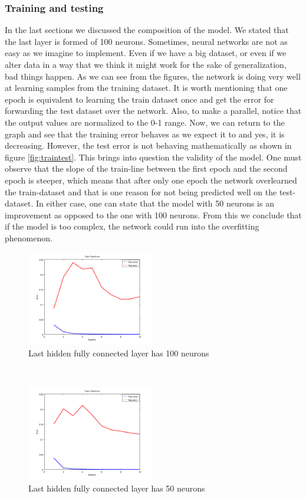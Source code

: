 \subsubsection{Training and testing}
In the last sections we discussed the composition of the model. We stated that the last layer is formed of 100 neurons. Sometimes, neural networks are not as easy as we imagine to implement. Even if we have a big dataset, or even if we alter data in a way that we think it might work for the sake of generalization, bad things happen. As we can see from the figures, the network is doing very well at learning samples from the training dataset. It is worth mentioning that one epoch is equivalent to learning the train dataset once and get the error for forwarding the test dataset over the network. Also, to make a parallel, notice that the output values are normalized to the 0-1 range. Now, we can return to the graph and see that the training error behaves as we expect it to and yes, it is decreasing. However, the test error is not behaving mathematically as shown in figure \ref{fig:traintest}. This brings into question the validity of the model. One must observe that the slope of the train-line between the first epoch and the second epoch is steeper, which means that after only one epoch the network overlearned the train-dataset and that is one reason for not being predicted well on the test-dataset. In either case, one can state that the model with 50 neurons is an improvement as opposed to the one with 100 neurons. From this we conclude that if the model is too complex, the network could run into the overfitting phenomenon.
\begin{figure}[h]
	\begin{center}
		\includegraphics[width=209px,height=157px]{src/img/system-design/train-test-100}
		\caption{Last hidden fully connected layer has 100 neurons} \label{fig:50tt}
    \end{center}
\end{figure}
~\\
\begin{figure}[h]
	\begin{center}
		\includegraphics[width=209px,height=157px]{src/img/system-design/train-test-50}
		\caption{Last hidden fully connected layer has 50 neurons} \label{fig:100tt}
    \end{center}
\end{figure}
\newpage

